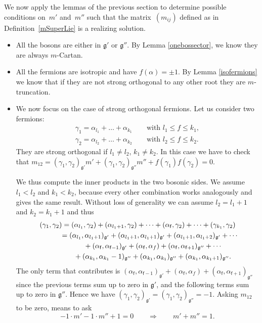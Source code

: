\documentclass[pdftex]{sigma}%
\numberwithin{equation}{section}
\newcommand{\g}{\mathfrak{g}}
\newcommand{\f}{\mathsf{f}}
\begin{document}
We now apply the lemmas of the previous section to determine possible conditions on~$m'$ and~$m''$ such that the matrix~$(m_{ij})$ defined as in Definition~\ref{mSuperLie} is a realizing solution.
\begin{itemize}\itemsep=0pt
	\item All the bosons are either in $\mathfrak{g'}$ or $\mathfrak{g''}$. By Lemma \ref{onebossector}, we know they are always $m$-Cartan.
	\item All the fermions are isotropic and have $f(\alpha)= \pm 1$. By Lemma \ref{isofermions} we know that if they are not strong orthogonal to any other root they are $m$-truncation.
	\item We now focus on the case of strong orthogonal fermions. Let us consider two fermions:
\begin{gather*}
\gamma_1 = \alpha_{l_1}+ \dots + \alpha_{k_1} \qquad \text{with }  l_1\leq f \leq k_1, \\
\gamma_2 = \alpha_{l_2}+ \dots + \alpha_{k_2} \qquad \text{with }  l_2\leq f \leq k_2.
\end{gather*}	
	They are strong orthogonal if $l_1 \neq l_2$, $k_1 \neq k_2$.
	In this case we have to check that $m_{12}=(\gamma_1, \gamma_2)_\mathfrak{g'}m' + (\gamma_1, \gamma_2)_\mathfrak{g''}m'' + f(\gamma_1)f(\gamma_2) =0$.

	We thus compute the inner products in the two bosonic sides. We assume $l_1 < l_2$ and $k_1 < k_2$, because every other combination works analogously and gives the same result. Without loss of generality we can assume $l_2 = l_1+1$ and $k_2 = k_1+1$ and thus
\begin{gather*}
(\gamma_1, \gamma_2) = (\alpha_{l_1}, \gamma_2) + ( \alpha_{l_1+1}, \gamma_2) + \dots + (\alpha_\f, \gamma_2) + \dots + (\gamma_{k_1}, \gamma_2)\\
\hphantom{(\gamma_1, \gamma_2)}{}
= (\alpha_{l_1}, \alpha_{l_1+1})_\mathfrak{g'}
							 + ( \alpha_{l_1+1}, \alpha_{l_1+1})_\mathfrak{g'} + ( \alpha_{l_1+1}, \alpha_{l_1+2})_\mathfrak{g'}
							 + \cdots \\
\hphantom{(\gamma_1, \gamma_2)=}{}
							 +(\alpha_\f, \alpha_{\f-1})_\mathfrak{g'} + (\alpha_\f, \alpha_{f}) + (\alpha_\f, \alpha_{\f+1})_\mathfrak{g''}
							 +\cdots\\
\hphantom{(\gamma_1, \gamma_2)=}{}
+(\alpha_{k_1}, \alpha_{k_1}-1)_\mathfrak{g''} + (\alpha_{k_1},\alpha_{k_1})_\mathfrak{g''}+ (\alpha_{k_1}, \alpha_{k_1+1})_\mathfrak{g''}	.				
		\end{gather*}				
		The only term that contributes is $(\alpha_\f, \alpha_{\f-1})_\mathfrak{g'} + (\alpha_\f, \alpha_{f}) + (\alpha_\f, \alpha_{\f+1})_\mathfrak{g''}$ since the previous terms sum up to zero in $\mathfrak{g'}$, and the following terms sum up to zero in $\mathfrak{g''}$. Hence we have
		$(\gamma_1, \gamma_2)_{\g'}= (\gamma_1, \gamma_2)_{\g''}= -1.$
		Asking $m_{12}$ to be zero, means to ask \[-1 \cdot m' -1\cdot m'' + 1 = 0 \qquad \Rightarrow \qquad m' + m'' = 1.\]
\end{itemize}
\end{document}
